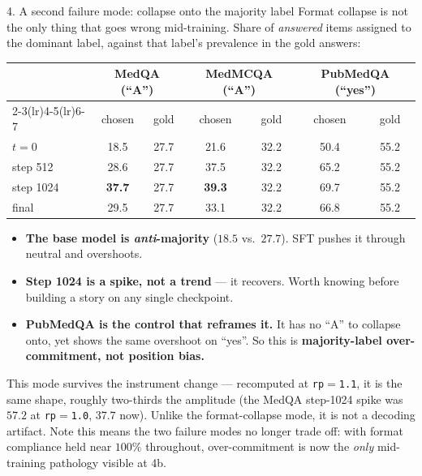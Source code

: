 \documentclass[aspectratio=169,10pt]{beamer}
\newcommand{\good}[1]{\textcolor{up}{#1}}
\newcommand{\bad}[1]{\textcolor{down}{#1}}
\begin{document}
\begin{frame}{4. A second failure mode: collapse onto the majority label}
  \small
  Format collapse is not the only thing that goes wrong mid-training. Share of
  \emph{answered} items assigned to the dominant label, against that label's
  prevalence in the gold answers:

  \vspace{0.5em}
  \centering
  \begin{tabular}{lcccccc}
    \toprule
    & \multicolumn{2}{c}{MedQA (``A'')} & \multicolumn{2}{c}{MedMCQA (``A'')}
    & \multicolumn{2}{c}{PubMedQA (``yes'')} \\
    \cmidrule(lr){2-3}\cmidrule(lr){4-5}\cmidrule(lr){6-7}
    & chosen & gold & chosen & gold & chosen & gold \\
    \midrule
    $t{=}0$      & 18.5 & 27.7 & 21.6 & 32.2 & 50.4 & 55.2 \\
    step 512     & 28.6 & 27.7 & 37.5 & 32.2 & 65.2 & 55.2 \\
    step 1024    & \bad{\textbf{37.7}} & 27.7 & \bad{\textbf{39.3}} & 32.2 & \bad{69.7} & 55.2 \\
    final        & 29.5 & 27.7 & 33.1 & 32.2 & 66.8 & 55.2 \\
    \bottomrule
  \end{tabular}

  \vspace{0.8em}
  \begin{itemize}\setlength{\itemsep}{0.2em}
    \item \textbf{The base model is \emph{anti}-majority} ($18.5$ vs.\ $27.7$).
      SFT pushes it through neutral and overshoots.
    \item \textbf{Step 1024 is a spike, not a trend} --- it recovers. Worth
      knowing before building a story on any single checkpoint.
    \item \textbf{PubMedQA is the control that reframes it.} It has no ``A'' to
      collapse onto, yet shows the same overshoot on ``yes''. So this is
      \textbf{majority-label over-commitment, not position bias.}
  \end{itemize}
  \vfill
  {\footnotesize \good{This mode survives the instrument change} --- recomputed
  at \texttt{rp}$=$\texttt{1.1}, it is the same shape, roughly two-thirds the
  amplitude (the MedQA step-1024 spike was $57.2$ at \texttt{rp}$=$\texttt{1.0},
  $37.7$ now). \bad{Unlike the format-collapse mode, it is not a decoding
  artifact.} Note this means the two failure modes no longer trade off: with
  format compliance held near $100\%$ throughout, over-commitment is now the
  \emph{only} mid-training pathology visible at 4b.}
\end{frame}
\end{document}

